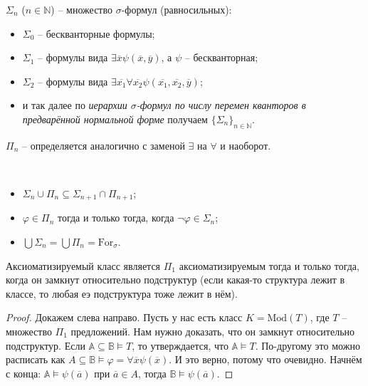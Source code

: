 \begin{definition}
    $\Sigma_n$ ($n \in \mathbb{N}$) -- множество $\sigma$-формул (равносильных): 

    \begin{itemize}
        \item $\Sigma_0$ -- бескванторные формулы; 
        \item $\Sigma_1$ -- формулы вида $\exists \overline{x} \psi(\overline{x}, \overline{y})$, а $\psi$ -- бескванторная; 
        \item $\Sigma_2$ -- формулы вида $\exists \overline{x_1} \forall \overline{x_2} \psi(\overline{x_1}, \overline{x_2}, \overline{y})$;
        \item и так далее по \textit{иерархии $\sigma$-формул по числу перемен кванторов в предварённой нормальной форме} получаем $\{\Sigma_n\}_{n \in \mathbb{N}}$.
    \end{itemize}

    $\Pi_n$ --  определяется аналогично с заменой $\exists$ на $\forall$ и наоборот.
\end{definition}

\begin{prop} \ 

    \begin{itemize}
        \item $\Sigma_n \cup \Pi_n \subseteq \Sigma_{n+1} \cap \Pi_{n+1}$; 
        \item $\varphi \in \Pi_n$ тогда и только тогда, когда $\neg \varphi \in \Sigma_n$; 
        \item $\bigcup \Sigma_n = \bigcup \Pi_n = \text{For}_\sigma$.
    \end{itemize}
\end{prop}


\begin{theorem}
    Аксиоматизируемый класс является $\Pi_1$ аксиоматизируемым тогда и только тогда, когда он замкнут относительно подструктур (если какая-то структура лежит в классе, то любая еэ подструктура тоже лежит в нём).
\end{theorem}

\begin{proof}
    Докажем слева направо. Пусть у нас есть класс $K = \text{Mod}(T)$, где $T$ -- множество $\Pi_1$ предложений. Нам нужно доказать, что он замкнут относительно подструктур. Если $\mathbb{A}\subseteq \mathbb{B} \models T$, то утверждается, что $\mathbb{A}\models T$. По-другому это можно расписать как $A \subseteq \mathbb{B} \models \varphi = \forall \overline{x} \psi(\overline{x})$. И это верно, потому что очевидно. Начнём с конца: $\mathbb{A}\models \psi(\overline{a})$ при $\overline{a} \in A$, тогда $\mathbb{B} \models \psi(\overline{a})$. 
\end{proof}